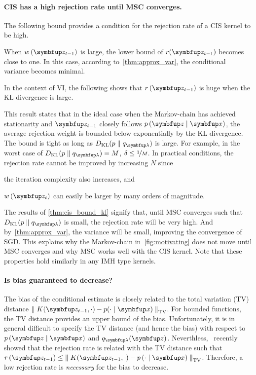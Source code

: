 \vspace{-0.1in}
\paragraph{CIS has a high rejection rate until MSC converges.}
The following bound provides a condition for the rejection rate of a CIS kernel to be high.
%

%
When \(w\,(\vz_{t-1})\) is large, the lower bound of \(r(\vz_{t-1})\) becomes close to one.
In this case, according to~\cref{thm:approx_var}, the conditional variance becomes minimal.

In the context of VI, the following shows that \(r\,(\vz_{t-1})\) is huge when the KL divergence is large.
%

%
This result states that in the ideal case when the Markov-chain has achieved stationarity and \(\vz_{t-1}\) closely follows \(p\,(\vz\mid\vx)\), the average rejection weight is bounded below exponentially by the KL divergence.
The bound is tight as long as \(\DKL{p}{q_{\vlambda}}\) is large.
For example, in the worst case of \(\DKL{p}{q_{\vlambda}} = M\), \(\delta \leq \nicefrac{1}{M}\).
In practical conditions, the rejection rate cannot be improved by increasing \(N\) since
\begin{enumerate*}[label=(\roman*)]
  \item the iteration complexity also increases, and
  \item \(w\,(\vz_t)\) can easily be larger by many orders of magnitude.
\end{enumerate*}

The results of \cref{thm:cis_bound_kl} signify that, until MSC converges such that \(\DKL{p}{q_{\vlambda}}\) is small, the rejection rate will be very high.
And by~\cref{thm:approx_var}, the variance will be small, improving the convergence of SGD.
This explains why the Markov-chain in~\cref{fig:motivating} does not move until MSC converges and why MSC works well with the CIS kernel.
Note that these properties hold similarly in any IMH type kernels.


\vspace{-0.1in}
\paragraph{Is bias guaranteed to decrease?}
The bias of the conditional estimate is closely related to the total variation (TV) distance \(\DTV{K(\vz_{t-1}, \cdot)}{p(\cdot\mid\vx)}\).
For bounded functions, the TV distance provides an upper bound of the bias.
Unfortunately, it is in general difficult to specify the TV distance (and hence the bias) with respect to \(p\,(\vz\mid\vx)\) and \(q_{\vlambda}(\vz)\).
Neverthless,~\citet{wang_exact_2020} recently showed that the rejection rate is related with the TV distance such that \(r\,(\vz_{t-1}) \leq \DTV{K(\vz_{t-1}, \cdot)}{p\,(\cdot\mid\vx)}\).
Therefore, a low rejection rate is \textit{necessary} for the bias to decrease.

